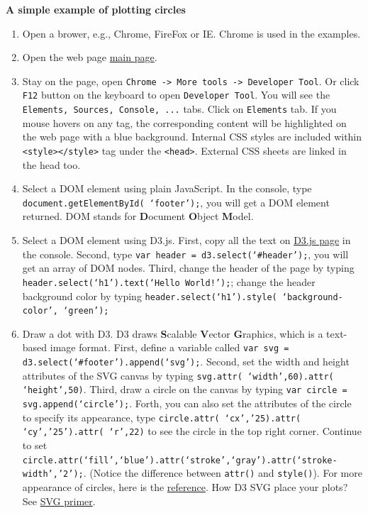 \documentclass[a4paper, 11pt]{article}
\begin{document}
\textbf{A simple example of plotting circles}
\begin{enumerate}
\item Open a brower, e.g., Chrome, FireFox or IE. Chrome is used in the examples.
\item Open the web page \href{http://nymph332088.github.io/CIS4340/index.html}{main page}.
\item Stay on the page, open \texttt{Chrome -> More tools -> Developer Tool}. Or click \texttt{F12} button on the keyboard to open \texttt{Developer Tool}. You will see the \texttt{Elements, Sources, Console, ...} tabs. Click on \texttt{Elements} tab. If you mouse hovers on any tag, the corresponding content will be highlighted on the web page with a blue background. Internal CSS styles are included within \texttt{<style></style>} tag under the \texttt{<head>}. External CSS sheets are linked in the head too.
\item Select a DOM element using plain JavaScript. In the console, type \texttt{document.getElementById( `footer');}, you will get a DOM element returned. DOM stands for {\bf D}ocument {\bf O}bject {\bf M}odel.
\item Select a DOM element using D3.js. First, copy all the text on \href{https://raw.githubusercontent.com/mbostock/d3/master/d3.min.js}{D3.js page} in the console. Second, type \texttt{var header = d3.select(`\#{header}');}, you will get an array of DOM nodes. Third, change the header of the page by typing \texttt{header.select(`h1').text(`Hello World!');}; change the header background color by typing \texttt{header.select(`h1').style( `background-color', `green');}
\item Draw a dot with D3. D3 draws {\bf S}calable {\bf V}ector {\bf G}raphics, which is a text-based image format. First, define a variable called \texttt{var svg = d3.select(`\#{footer}').append(`svg');}. Second, set the width and height attributes of the SVG canvas by typing {\tt svg.attr( `width',60).attr( `height',50)}. Third, draw a circle on the canvas by typing \texttt{var circle = svg.append(`circle');}. Forth, you can also set the attributes of the circle to specify its appearance, type \texttt{circle.attr( `cx','25).attr( `cy','25').attr( `r',22)} to see the circle in the top right corner. Continue to set \texttt{circle.attr(`fill',`blue').attr(`stroke',`gray').attr(`stroke-width','2');}. (Notice the difference between \texttt{attr()} and \texttt{style()}). For more appearance of circles, here is the \href{http://alignedleft.com/tutorials/d3/an-svg-primer}{reference}. How D3 SVG place your plots? See \href{http://alignedleft.com/tutorials/d3/an-svg-primer}{SVG primer}.


\end{enumerate}
\end{document}

